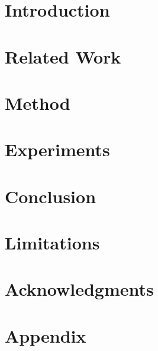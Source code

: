 \documentclass[11pt]{article}
\title{}
\author{TODO}
\date{}
\begin{document}
\maketitle

\begin{abstract}

\end{abstract}

\section{Introduction}


\section{Related Work}


\section{Method}


\section{Experiments}


\section{Conclusion}


\section*{Limitations}


\section*{Acknowledgments}





\appendix
\section{Appendix}

\end{document}
